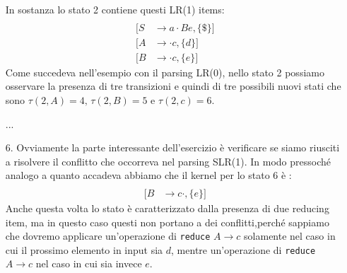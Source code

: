 \documentclass[class=book, crop=false, oneside, 12pt]{standalone}
\begin{document}
\begin{enumerate}
    In sostanza lo stato 2 contiene questi LR(1) items:
    \begin{align*}
        [S &\to a \cdot Ad, \{\$\}] \\
        [S &\to a \cdot Be, \{\$\}] \\
        [A &\to \cdot c, \{d\}] \\
        [B &\to \cdot c, \{e\}]
    \end{align*}
    Come succedeva nell'esempio con il parsing LR(0), nello stato 2 possiamo osservare la presenza di tre transizioni e quindi di tre possibili nuovi stati che sono \(\tau(2,A)=4 \textrm{, } \tau(2,B)=5 \textrm{ e } \tau(2,c)=6\).
    \item[...]
    \item[6.] Ovviamente la parte interessante dell'esercizio è verificare se siamo riusciti a risolvere il conflitto che occorreva nel parsing SLR(1). In modo pressoché analogo a quanto accadeva abbiamo che il kernel per lo stato 6 è :
    \begin{align*}
        [A &\to c \cdot, \{d\}] \\
        [B &\to c \cdot, \{e\}]
    \end{align*}
    Anche questa volta lo stato è caratterizzato dalla presenza di due reducing item, ma in questo caso questi non portano a dei conflitti,perché sappiamo che dovremo applicare un'operazione di \texttt{reduce} \(A \to c\) solamente nel caso in cui il prossimo elemento in input sia \(d\), mentre un'operazione di \texttt{reduce} \(A \to c\) nel caso in cui sia invece \(e\).
\end{enumerate}
\end{document}
